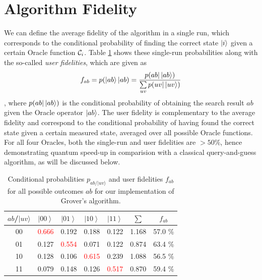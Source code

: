 \section{Algorithm Fidelity}

We can define the average fidelity of the algorithm in a single run, which corresponds to the conditional probability of finding the correct state $\left| i \right>$ given a certain Oracle function $\Or_i$.  Table \ref{tab:Probabilities-for-obtaining} shows these single-run probabilities along with the so-called {\it user fidelities}, which are given as
%
\begin{equation}
f_{ab} = p(\left| ab \right>|ab) = \frac{p(ab |\left| ab \right>)}{\sum\limits_{uv}p(uv|\left| uv \right>)} 
\end{equation}
%
, where $p(ab|\left| ab \right>)$ is the conditional probability of obtaining the search result $ab$ given the Oracle operator $\left| ab \right>$. The user fidelity is complementary to the average fidelity and correspond to the conditional probability of having found the correct state given a certain measured state, averaged over all possible Oracle functions. For all four Oracles, both the single-run and user fidelities are $> 50 \%$, hence demonstrating quantum speed-up in comparision with a classical query-and-guess algorithm, as will be discussed below.

\begin{table}[H]
\begin{centering}
\begin{tabular}{|c|c|c|c|c|c|c|}
\hline 
$ab$/$|uv\rangle$ & $\left|00\right\rangle $ & $\left|01\right\rangle $ & $\left|10\right\rangle $ & $\left|11\right\rangle $ & $\sum$ & $f_{ab}$\tabularnewline
\hline
\hline 
00 & \textcolor{red}{0.666} & 0.192 & 0.188 & 0.122 & 1.168 & 57.0 \%\tabularnewline
\hline 
01 & 0.127 & \textcolor{red}{0.554} & 0.071 & 0.122 & 0.874 & 63.4 \%\tabularnewline
\hline 
10 & 0.128 & 0.106 & \textcolor{red}{0.615} & 0.239 & 1.088 & 56.5 \%\tabularnewline
\hline 
11 & 0.079 & 0.148 & 0.126 & \textcolor{red}{0.517} & 0.870 & 59.4 \%\tabularnewline
\hline
\end{tabular}
\par\end{centering}

\caption{\label{tab:Probabilities-for-obtaining}Conditional probabilities
$p_{ab/|uv\rangle}$ and user fidelities $f_{ab}$ for all
possible outcomes $ab$ for our implementation of Grover's algorithm.}

\end{table}

